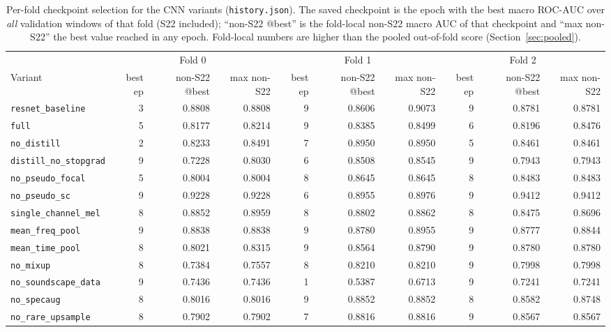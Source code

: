 \begingroup\footnotesize
\begin{table}[H]\centering
\caption{Per-fold checkpoint selection for the CNN variants (\texttt{history.json}). The saved checkpoint is the epoch with the best macro ROC-AUC over \emph{all} validation windows of that fold (S22 included); ``non-S22 @best'' is the fold-local non-S22 macro AUC of that checkpoint and ``max non-S22'' the best value reached in any epoch. Fold-local numbers are higher than the pooled out-of-fold score (Section~\ref{sec:pooled}).}
\label{tab:perfold}
\setlength{\tabcolsep}{3pt}
\begin{adjustbox}{max width=\linewidth}
\begin{tabular}{lrrrrrrrrr}
\toprule
 & \multicolumn{3}{c}{Fold 0} & \multicolumn{3}{c}{Fold 1} & \multicolumn{3}{c}{Fold 2} \\
\cmidrule(lr){2-4}\cmidrule(lr){5-7}\cmidrule(lr){8-10}
Variant & best ep & non-S22 @best & max non-S22 & best ep & non-S22 @best & max non-S22 & best ep & non-S22 @best & max non-S22 \\
\midrule
\texttt{resnet\_baseline} & 3 & 0.8808 & 0.8808 & 9 & 0.8606 & 0.9073 & 9 & 0.8781 & 0.8781 \\
\texttt{full} & 5 & 0.8177 & 0.8214 & 9 & 0.8385 & 0.8499 & 6 & 0.8196 & 0.8476 \\
\texttt{no\_distill} & 2 & 0.8233 & 0.8491 & 7 & 0.8950 & 0.8950 & 5 & 0.8461 & 0.8461 \\
\texttt{distill\_no\_stopgrad} & 9 & 0.7228 & 0.8030 & 6 & 0.8508 & 0.8545 & 9 & 0.7943 & 0.7943 \\
\texttt{no\_pseudo\_focal} & 5 & 0.8004 & 0.8004 & 8 & 0.8645 & 0.8645 & 8 & 0.8483 & 0.8483 \\
\texttt{no\_pseudo\_sc} & 9 & 0.9228 & 0.9228 & 6 & 0.8955 & 0.8976 & 9 & 0.9412 & 0.9412 \\
\texttt{single\_channel\_mel} & 8 & 0.8852 & 0.8959 & 8 & 0.8802 & 0.8862 & 8 & 0.8475 & 0.8696 \\
\texttt{mean\_freq\_pool} & 9 & 0.8838 & 0.8838 & 9 & 0.8780 & 0.8955 & 9 & 0.8777 & 0.8844 \\
\texttt{mean\_time\_pool} & 8 & 0.8021 & 0.8315 & 9 & 0.8564 & 0.8790 & 9 & 0.8780 & 0.8780 \\
\texttt{no\_mixup} & 8 & 0.7384 & 0.7557 & 8 & 0.8210 & 0.8210 & 9 & 0.7998 & 0.7998 \\
\texttt{no\_soundscape\_data} & 9 & 0.7436 & 0.7436 & 1 & 0.5387 & 0.6713 & 9 & 0.7241 & 0.7241 \\
\texttt{no\_specaug} & 8 & 0.8016 & 0.8016 & 9 & 0.8852 & 0.8852 & 8 & 0.8582 & 0.8748 \\
\texttt{no\_rare\_upsample} & 8 & 0.7902 & 0.7902 & 7 & 0.8816 & 0.8816 & 9 & 0.8567 & 0.8567 \\
\bottomrule
\end{tabular}
\end{adjustbox}
\end{table}
\endgroup
